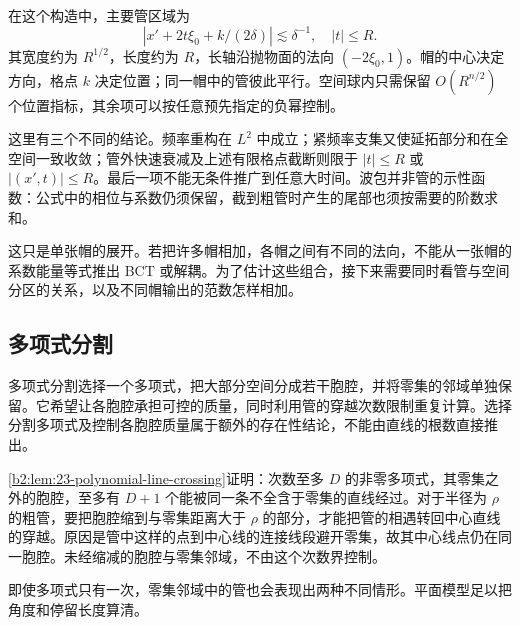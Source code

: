 在这个构造中，主要管区域为
\[
 |x'+2t\xi_0+k/(2\delta)|\lesssim\delta^{-1},\quad
 |t|\leq R.
\]
其宽度约为 \(R^{1/2}\)，长度约为 \(R\)，长轴沿抛物面的法向 \((-2\xi_0,1)\)。帽的中心决定方向，格点 \(k\) 决定位置；同一帽中的管彼此平行。空间球内只需保留 \(O(R^{n/2})\) 个位置指标，其余项可以按任意预先指定的负幂控制。

\ProseParagraphBreak
这里有三个不同的结论。频率重构在 \(L^2\) 中成立；紧频率支集又使延拓部分和在全空间一致收敛；管外快速衰减及上述有限格点截断则限于 \(|t|\leq R\) 或 \(|(x',t)|\leq R\)。最后一项不能无条件推广到任意大时间。波包并非管的示性函数：公式中的相位与系数仍须保留，截到粗管时产生的尾部也须按需要的阶数求和。

\ProseParagraphBreak
这只是单张帽的展开。若把许多帽相加，各帽之间有不同的法向，不能从一张帽的系数能量等式推出 BCT 或解耦。为了估计这些组合，接下来需要同时看管与空间分区的关系，以及不同帽输出的范数怎样相加。

\subsection{多项式分割}
\label{b2:subsec:250503}

多项式分割选择一个多项式，把大部分空间分成若干胞腔，并将零集的邻域单独保留。它希望让各胞腔承担可控的质量，同时利用管的穿越次数限制重复计算。选择分割多项式及控制各胞腔质量属于额外的存在性结论，不能由直线的根数直接推出。

\ProseParagraphBreak
\cref{b2:lem:23-polynomial-line-crossing}证明：次数至多 \(D\) 的非零多项式，其零集之外的胞腔，至多有 \(D+1\) 个能被同一条不全含于零集的直线经过。对于半径为 \(\rho\) 的粗管，要把胞腔缩到与零集距离大于 \(\rho\) 的部分，才能把管的相遇转回中心直线的穿越。原因是管中这样的点到中心线的连接线段避开零集，故其中心线点仍在同一胞腔。未经缩减的胞腔与零集邻域，不由这个次数界控制。

即使多项式只有一次，零集邻域中的管也会表现出两种不同情形。平面模型足以把角度和停留长度算清。

